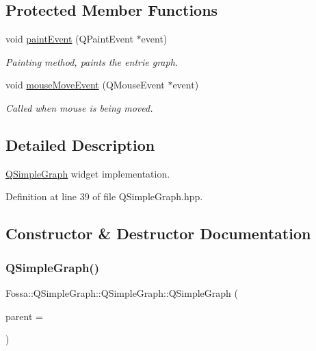 \subsection*{Protected Member Functions}
\begin{DoxyCompactItemize}
\item 
void \hyperlink{class_fossa_1_1_q_simple_graph_1_1_q_simple_graph_a6559739099820e1303c1dbe2c5757bc4}{paint\+Event} (Q\+Paint\+Event $\ast$event)
\begin{DoxyCompactList}\small\item\em Painting method, paints the entrie graph. \end{DoxyCompactList}\item 
void \hyperlink{class_fossa_1_1_q_simple_graph_1_1_q_simple_graph_a7ae9773902324fc533f0b18294f7c516}{mouse\+Move\+Event} (Q\+Mouse\+Event $\ast$event)
\begin{DoxyCompactList}\small\item\em Called when mouse is being moved. \end{DoxyCompactList}\end{DoxyCompactItemize}


\subsection{Detailed Description}
\hyperlink{class_fossa_1_1_q_simple_graph_1_1_q_simple_graph}{Q\+Simple\+Graph} widget implementation. 

Definition at line 39 of file Q\+Simple\+Graph.\+hpp.



\subsection{Constructor \& Destructor Documentation}
\mbox{\label{class_fossa_1_1_q_simple_graph_1_1_q_simple_graph_ab08b1293b3698e1e179a8d36dc737c77}} 
\subsubsection{\texorpdfstring{Q\+Simple\+Graph()}{QSimpleGraph()}}
{\footnotesize\ttfamily Fossa\+::\+Q\+Simple\+Graph\+::\+Q\+Simple\+Graph\+::\+Q\+Simple\+Graph (\begin{DoxyParamCaption}\item[{Q\+Widget $\ast$}]{parent = {} }\end{DoxyParamCaption})}



